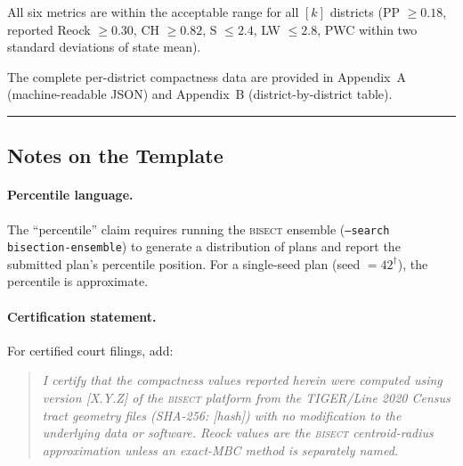 \noindent All six metrics are within the acceptable range for all $[k]$ districts
(PP $\geq 0.18$, reported Reock $\geq 0.30$, CH $\geq 0.82$, S $\leq 2.4$, LW $\leq 2.8$,
PWC within two standard deviations of state mean).

\noindent The complete per-district compactness data are provided in Appendix~A
(machine-readable JSON) and Appendix~B (district-by-district table).

\bigskip
\hrule
\bigskip

\subsection{Notes on the Template}

\paragraph{Percentile language.}
The ``percentile'' claim requires running the \textsc{bisect} ensemble
(\texttt{--search bisection-ensemble}) to generate a distribution of plans
and report the submitted plan's percentile position.
For a single-seed plan (seed $= 42^\dagger$), the percentile is approximate.

\paragraph{Certification statement.}
For certified court filings, add:
\begin{quote}
  \emph{I certify that the compactness values reported herein were computed
  using version [X.Y.Z] of the \textsc{bisect} platform from the TIGER/Line
  2020 Census tract geometry files (SHA-256: [hash]) with no modification to
  the underlying data or software. Reock values are the \textsc{bisect}
  centroid-radius approximation unless an exact-MBC method is separately named.}
\end{quote}
